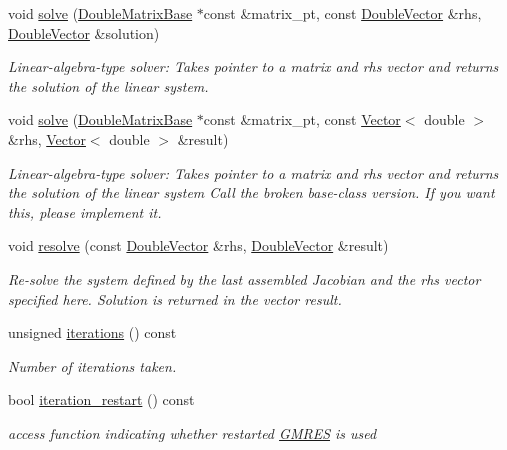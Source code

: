 \begin{DoxyCompactItemize}
void \hyperlink{classoomph_1_1GMRES_ab61100de9df6d717e50548b034491a9b}{solve} (\hyperlink{classoomph_1_1DoubleMatrixBase}{Double\+Matrix\+Base} $\ast$const \&matrix\+\_\+pt, const \hyperlink{classoomph_1_1DoubleVector}{Double\+Vector} \&rhs, \hyperlink{classoomph_1_1DoubleVector}{Double\+Vector} \&solution)
\begin{DoxyCompactList}\small\item\em Linear-\/algebra-\/type solver\+: Takes pointer to a matrix and rhs vector and returns the solution of the linear system. \end{DoxyCompactList}\item 
void \hyperlink{classoomph_1_1GMRES_ab2d5a5beea3383391404a62515a210d9}{solve} (\hyperlink{classoomph_1_1DoubleMatrixBase}{Double\+Matrix\+Base} $\ast$const \&matrix\+\_\+pt, const \hyperlink{classoomph_1_1Vector}{Vector}$<$ double $>$ \&rhs, \hyperlink{classoomph_1_1Vector}{Vector}$<$ double $>$ \&result)
\begin{DoxyCompactList}\small\item\em Linear-\/algebra-\/type solver\+: Takes pointer to a matrix and rhs vector and returns the solution of the linear system Call the broken base-\/class version. If you want this, please implement it. \end{DoxyCompactList}\item 
void \hyperlink{classoomph_1_1GMRES_a18e32688dcbd8806f1f23d754fc712a3}{resolve} (const \hyperlink{classoomph_1_1DoubleVector}{Double\+Vector} \&rhs, \hyperlink{classoomph_1_1DoubleVector}{Double\+Vector} \&result)
\begin{DoxyCompactList}\small\item\em Re-\/solve the system defined by the last assembled Jacobian and the rhs vector specified here. Solution is returned in the vector result. \end{DoxyCompactList}\item 
unsigned \hyperlink{classoomph_1_1GMRES_a879927e08b79ad4744a10b360ccd5ff3}{iterations} () const
\begin{DoxyCompactList}\small\item\em Number of iterations taken. \end{DoxyCompactList}\item 
bool \hyperlink{classoomph_1_1GMRES_aee2cac6885b0b9a3e73337eb02dc96d7}{iteration\+\_\+restart} () const
\begin{DoxyCompactList}\small\item\em access function indicating whether restarted \hyperlink{classoomph_1_1GMRES}{G\+M\+R\+ES} is used \end{DoxyCompactList}\item 

\end{DoxyCompactItemize}
